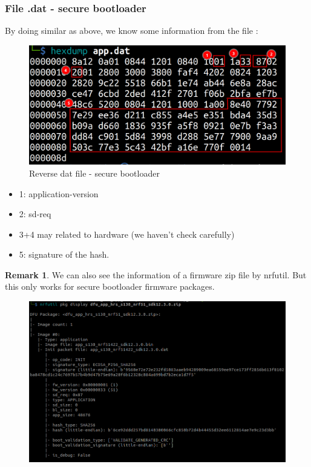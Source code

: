\documentclass{article}
\theoremstyle{plain}
\theoremstyle{definition}
\newtheorem{remark}{Remark}
\numberwithin{equation}{section}
\begin{document}
\subsubsection{File .dat - secure bootloader}
By doing similar as above, we know some information from the file :
\begin{figure}[H]
	\centering
	\includegraphics[width=0.7\linewidth]{images/reverse-dat-file-secure.png}
	\caption{Reverse dat file - secure bootloader}
	\label{fig:reverse-dat-secure}
\end{figure}

\begin{itemize}
	\item 1: application-version
	\item 2: sd-req
	\item 3+4 may related to hardware (we haven't check carefully)
	\item 5: signature of the hash.
\end{itemize}

\begin{remark}
	We can also see the information of a firmware zip file by nrfutil. But this only works for secure bootloader firmware packages.
	\begin{figure}[H]
		\centering
		\includegraphics[width=1\linewidth]{images/nrfutil-see-information}
		\caption{}
		\label{fig:nrfutil-see-information}
	\end{figure}
\end{remark}
\end{document}
